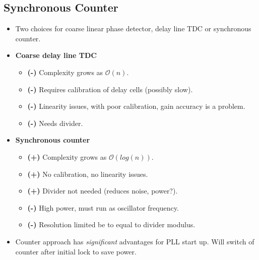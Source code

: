 	\subsection{Synchronous Counter}
		\begin{itemize}[itemsep=4pt,label=\protect---]
			\item Two choices for coarse linear phase detector, delay line TDC or synchronous counter.

				\item \textbf{Coarse delay line TDC}
				\begin{itemize}
					\item {\color{red}\textbf{(-)}} Complexity grows as $\mathcal{O}(n)$.
					\item {\color{red}\textbf{(-)}} Requires calibration of delay cells (possibly slow).
					\item {\color{red}\textbf{(-)}} Linearity issues, with poor calibration, gain accuracy is a problem.
					\item {\color{red}\textbf{(-)}} Needs divider.
				\end{itemize}

				\item \textbf{Synchronous counter}
				\begin{itemize}
					\item {\color{teal}\textbf{(+)}} Complexity grows as $\mathcal{O}(log(n))$.
					\item {\color{teal}\textbf{(+)}} No calibration, no linearity issues.
					\item {\color{teal}\textbf{(+)}} Divider not needed (reduces noise, power?).
					\item {\color{red}\textbf{(-)}} High power, must run as oscillator frequency.
					\item {\color{red}\textbf{(-)}} Resolution limited be to equal to divider modulus.
				\end{itemize}
			\item Counter approach has \textit{significant} advantages for PLL start up. Will switch of counter after initial lock to save power.
		\end{itemize} 	
